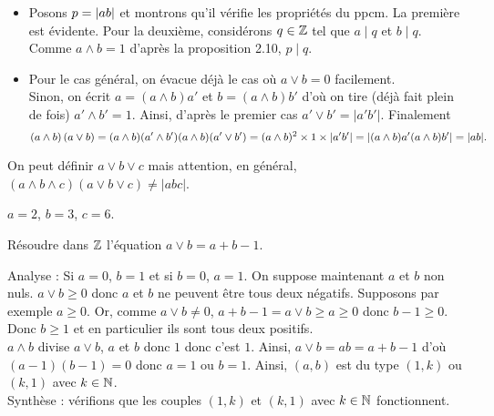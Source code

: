 \documentclass{magnolia}
\begin{document}
\begin{preuve}
\begin{itemize}
\item Posons $p=\left|ab\right|$ et montrons qu'il vérifie les propriétés du ppcm. La première est évidente. Pour la deuxième, considérons $q\in \mathbb{Z}$ tel que $a\mid q$ et $b\mid q$. Comme $a\wedge b=1$ d'après la proposition 2.10, $p\mid q$.
\item Pour le cas général, on évacue déjà le cas où $a\vee b=0$ facilement.\\
Sinon, on écrit $a=(a\wedge b)a'$ et $b=(a\wedge b)b'$ d'où on tire (déjà fait plein de fois) $a'\wedge b'=1$. Ainsi, d'après le premier cas $a'\vee b'=|a'b'|$. Finalement $$\left(a\wedge b\right)\left(a\vee b\right)=(a\wedge b)(a'\wedge b')(a\wedge b)(a'\vee b')=(a\wedge b)^2\times 1 \times |a'b'|=|(a\wedge b)a'(a\wedge b)b'|=|ab|.$$
\end{itemize}
\end{preuve}

\begin{remarqueUnique}
\remarque On peut définir $a\vee b \vee c$ mais attention, en général, $(a\wedge b \wedge c)(a\vee b \vee c)\neq |abc| $.
\end{remarqueUnique}

\begin{sol}
$a=2$, $b=3$, $c=6$.
\end{sol}

\begin{exoUnique}
\exo Résoudre dans $\mathbb{Z}$ l'équation $a\vee b=a+b-1$.
  \begin{sol}
  Analyse : Si $a=0$, $b=1$ et si $b=0$, $a=1$. On suppose maintenant $a$ et $b$ non nuls. $a\vee b\geq 0$ donc $a$ et $b$ ne peuvent être tous deux négatifs. Supposons par exemple $a\geq 0$. Or, comme $a\vee b\neq 0$, $a+b-1=a\vee b\geq a\geq 0$ donc $b-1\geq 0$. Donc $b\geq 1$ et en particulier ils sont tous deux positifs.\\
  $a\wedge b$ divise $a\vee b$, $a$ et $b$ donc $1$ donc c'est $1$. Ainsi, $a\vee b=ab=a+b-1$ d'où $(a-1)(b-1)=0$ donc $a=1$ ou $b=1$. Ainsi, $(a,b)$ est du type $(1,k)$ ou $(k,1)$ avec $k\in\mathbb{N}$.\\
  
  Synthèse : vérifions que les couples $(1,k)$ et $(k,1)$ avec $k\in\mathbb{N}$ fonctionnent.
  \end{sol}
\end{exoUnique}

\end{document}
